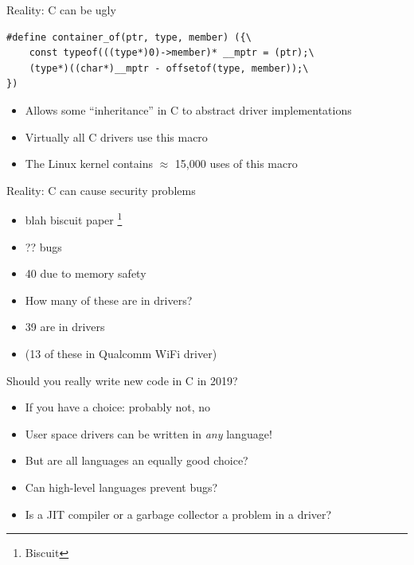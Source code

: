 \documentclass[NET,english,aspectratio=169,notitleframe]{tumbeamer}
\begin{document}
\begin{frame}[fragile]{Reality: C can be ugly}
\begin{verbatim}
#define container_of(ptr, type, member) ({\
	const typeof(((type*)0)->member)* __mptr = (ptr);\
	(type*)((char*)__mptr - offsetof(type, member));\
})
\end{verbatim}
\begin{itemize}
\item Allows some ``inheritance'' in C to abstract driver implementations
\item Virtually all C drivers use this macro
\item The Linux kernel contains $\approx$ 15,000 uses of this macro
\end{itemize}
\end{frame}


\begin{frame}{Reality: C can cause security problems}
\begin{itemize}
\item blah biscuit paper \footnote{Biscuit}
\item ?? bugs
\item 40 due to memory safety
\vspace{1em}
\item How many of these are in drivers?
\pause
\item 39 are in drivers
\item (13 of these in Qualcomm WiFi driver)
\end{itemize}
\end{frame}

\begin{frame}{Should you really write new code in C in 2019?}
\begin{itemize}
\item If you have a choice: probably not, no
\pause
\item User space drivers can be written in \emph{any} language!
\item But are all languages an equally good choice?
\item Can high-level languages prevent bugs?
\item Is a JIT compiler or a garbage collector a problem in a driver?
\end{itemize}
\end{frame}
\end{document}
